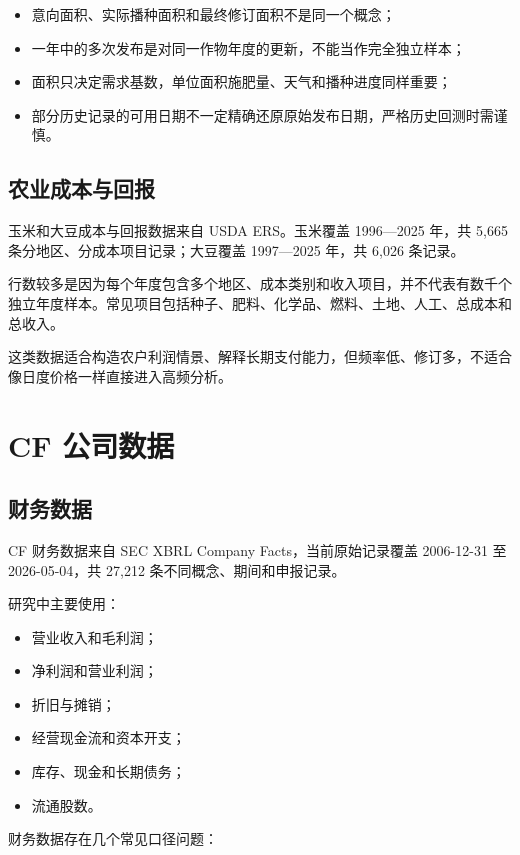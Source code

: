 \documentclass[11pt,a4paper]{ctexart}
\begin{document}
\begin{itemize}
  \item 意向面积、实际播种面积和最终修订面积不是同一个概念；
  \item 一年中的多次发布是对同一作物年度的更新，不能当作完全独立样本；
  \item 面积只决定需求基数，单位面积施肥量、天气和播种进度同样重要；
  \item 部分历史记录的可用日期不一定精确还原原始发布日期，严格历史回测时需谨慎。
\end{itemize}

\subsection{农业成本与回报}

玉米和大豆成本与回报数据来自 USDA ERS。玉米覆盖 1996---2025 年，共 5,665 条分地区、分成本项目记录；大豆覆盖 1997---2025 年，共 6,026 条记录。

行数较多是因为每个年度包含多个地区、成本类别和收入项目，并不代表有数千个独立年度样本。常见项目包括种子、肥料、化学品、燃料、土地、人工、总成本和总收入。

这类数据适合构造农户利润情景、解释长期支付能力，但频率低、修订多，不适合像日度价格一样直接进入高频分析。

\section{CF 公司数据}

\subsection{财务数据}

CF 财务数据来自 SEC XBRL Company Facts，当前原始记录覆盖 2006-12-31 至 2026-05-04，共 27,212 条不同概念、期间和申报记录。

研究中主要使用：

\begin{itemize}
  \item 营业收入和毛利润；
  \item 净利润和营业利润；
  \item 折旧与摊销；
  \item 经营现金流和资本开支；
  \item 库存、现金和长期债务；
  \item 流通股数。
\end{itemize}

财务数据存在几个常见口径问题：
\end{document}
